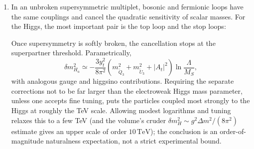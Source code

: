 \begin{enumerate}
  \begin{enumerate}
    \item[(a)]
    In an unbroken supersymmetric multiplet, bosonic and fermionic loops have
    the same couplings and cancel the quadratic sensitivity of scalar masses.
    For the Higgs, the most important pair is the top loop and the stop loops:
    \begin{center}
    \end{center}
    Once supersymmetry is softly broken, the cancellation stops at the
    superpartner threshold.  Parametrically,
    \[
      \delta m_{H_u}^2\simeq
      -\frac{3y_t^2}{8\pi^2}
       \left(m_{\widetilde Q_3}^2+m_{\widetilde U_3}^2+|A_t|^2\right)
       \ln\frac{\Lambda}{M_S},
      \tag{28.14.2}
    \]
    with analogous gauge and higgsino contributions.  Requiring the separate
    corrections not to be far larger than the electroweak Higgs mass
    parameter, unless one accepts fine tuning, puts the particles coupled
    most strongly to the Higgs at roughly the TeV scale.  Allowing modest
    logarithms and tuning relaxes this to a few TeV (and the volume's cruder
    \(\delta m_H^2\sim g^2\Delta m^2/(8\pi^2)\) estimate gives an upper scale
    of order \(10\,\mathrm{TeV}\)); the conclusion is an order-of-magnitude
    naturalness expectation, not a strict experimental bound.


\end{enumerate}
\end{enumerate}
